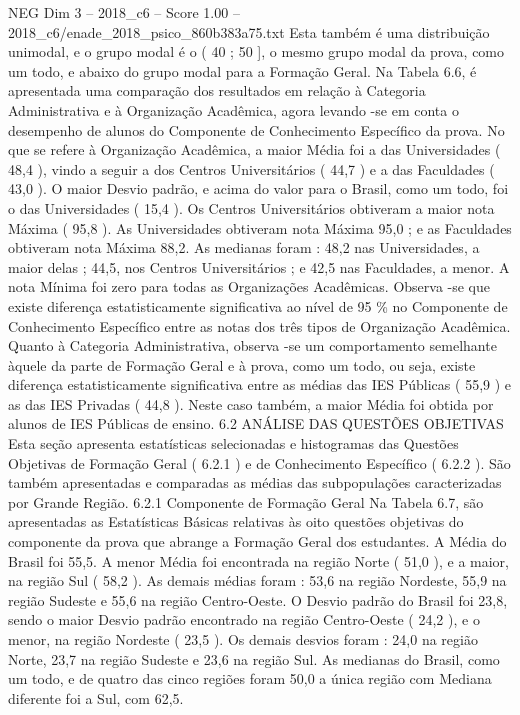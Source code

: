 \begin{textsample}{NEG Dim 3 – 2018\_c6 – Score 1.00 – 2018\_c6/enade\_2018\_psico\_860b383a75.txt}
Esta também é uma distribuição unimodal, e o grupo modal é o ( 40 ; 50 ], o mesmo grupo modal da prova, como um todo, e abaixo do grupo modal para a Formação Geral.
Na Tabela 6.6, é apresentada uma comparação dos resultados em relação à Categoria Administrativa e à Organização Acadêmica, agora levando -se em conta o desempenho de alunos do Componente de Conhecimento Específico da prova.
No que se refere à Organização Acadêmica, a maior Média foi a das Universidades ( 48,4 ), vindo a seguir a dos Centros Universitários ( 44,7 ) e a das Faculdades ( 43,0 ).
O maior Desvio padrão, e acima do valor para o Brasil, como um todo, foi o das Universidades ( 15,4 ).
Os Centros Universitários obtiveram a maior nota Máxima ( 95,8 ).
As Universidades obtiveram nota Máxima 95,0 ; e as Faculdades obtiveram nota Máxima 88,2.
As medianas foram : 48,2 nas Universidades, a maior delas ; 44,5, nos Centros Universitários ; e 42,5 nas Faculdades, a menor.
A nota Mínima foi zero para todas as Organizações Acadêmicas.
Observa -se que existe diferença estatisticamente significativa ao nível de 95 \% no Componente de Conhecimento Específico entre as notas dos três tipos de Organização Acadêmica.
Quanto à Categoria Administrativa, observa -se um comportamento semelhante àquele da parte de Formação Geral e à prova, como um todo, ou seja, existe diferença estatisticamente significativa entre as médias das IES Públicas ( 55,9 ) e as das IES Privadas ( 44,8 ).
Neste caso também, a maior Média foi obtida por alunos de IES Públicas de ensino. 6.2 ANÁLISE DAS QUESTÕES OBJETIVAS Esta seção apresenta estatísticas selecionadas e histogramas das Questões Objetivas de Formação Geral ( 6.2.1 ) e de Conhecimento Específico ( 6.2.2 ).
São também apresentadas e comparadas as médias das subpopulações caracterizadas por Grande Região. 6.2.1 Componente de Formação Geral Na Tabela 6.7, são apresentadas as Estatísticas Básicas relativas às oito questões objetivas do componente da prova que abrange a Formação Geral dos estudantes.
A Média do Brasil foi 55,5.
A menor Média foi encontrada na região Norte ( 51,0 ), e a maior, na região Sul ( 58,2 ).
As demais médias foram : 53,6 na região Nordeste, 55,9 na região Sudeste e 55,6 na região Centro-Oeste.
O Desvio padrão do Brasil foi 23,8, sendo o maior Desvio padrão encontrado na região Centro-Oeste ( 24,2 ), e o menor, na região Nordeste ( 23,5 ).
Os demais desvios foram : 24,0 na região Norte, 23,7 na região Sudeste e 23,6 na região Sul.
As medianas do Brasil, como um todo, e de quatro das cinco regiões foram 50,0 a única região com Mediana diferente foi a Sul, com 62,5.

\end{textsample}
